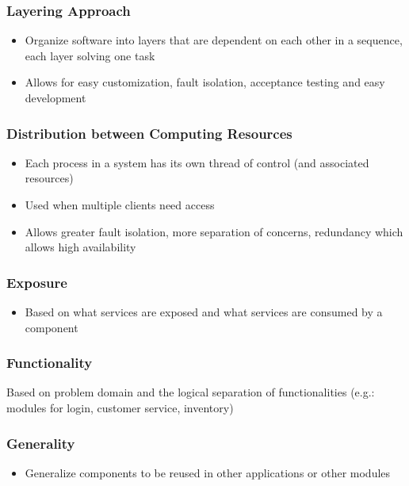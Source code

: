 \documentclass{article}
\begin{document}
\subsubsection{Layering Approach}
\begin{itemize}
    \item Organize software into layers that are dependent on each other in a sequence, each layer solving one task
    
    \item Allows for easy customization, fault isolation, acceptance testing and easy development
\end{itemize}

\subsubsection{Distribution between Computing Resources}
\begin{itemize}
    \item Each process in a system has its own thread of control (and associated resources)
    
    \item Used when multiple clients need access
    
    \item Allows greater fault isolation, more separation of concerns, redundancy which allows high availability
\end{itemize}

\subsubsection{Exposure}
\begin{itemize}
    \item Based on what services are exposed and what services are consumed by a component 
\end{itemize}

\subsubsection{Functionality}
Based on problem domain and the logical separation of functionalities (e.g.: modules for login, customer service, inventory)

\subsubsection{Generality}
\begin{itemize}
    \item Generalize components to be reused in other applications or other modules
\end{itemize}
\end{document}
